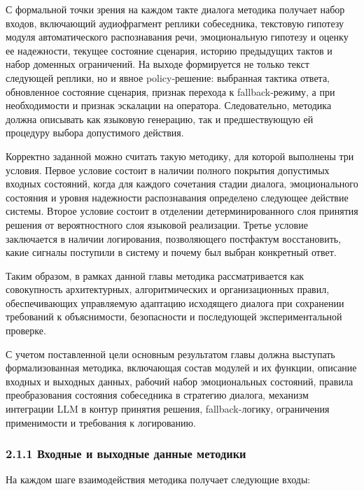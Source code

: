 \documentclass[a4paper,14pt]{extarticle}
\renewcommand{\texttt}[1]{\textnormal{#1}}
\begin{document}
С формальной точки зрения на каждом такте диалога методика получает
набор входов, включающий аудиофрагмент реплики собеседника, текстовую
гипотезу модуля автоматического распознавания речи, эмоциональную
гипотезу и оценку ее надежности, текущее состояние сценария, историю
предыдущих тактов и набор доменных ограничений. На выходе формируется не
только текст следующей реплики, но и явное policy-решение: выбранная
тактика ответа, обновленное состояние сценария, признак перехода к
fallback-режиму, а при необходимости и признак эскалации на оператора.
Следовательно, методика должна описывать как языковую генерацию, так и
предшествующую ей процедуру выбора допустимого действия.

Корректно заданной можно считать такую методику, для которой выполнены
три условия. Первое условие состоит в наличии полного покрытия
допустимых входных состояний, когда для каждого сочетания стадии
диалога, эмоционального состояния и уровня надежности распознавания
определено следующее действие системы. Второе условие состоит в
отделении детерминированного слоя принятия решения от вероятностного
слоя языковой реализации. Третье условие заключается в наличии
логирования, позволяющего постфактум восстановить, какие сигналы
поступили в систему и почему был выбран конкретный ответ.

Таким образом, в рамках данной главы методика рассматривается как
совокупность архитектурных, алгоритмических и организационных правил,
обеспечивающих управляемую адаптацию исходящего диалога при сохранении
требований к объяснимости, безопасности и последующей экспериментальной
проверке.

С учетом поставленной цели основным результатом главы должна выступать
формализованная методика, включающая состав модулей и их функции,
описание входных и выходных данных, рабочий набор эмоциональных
состояний, правила преобразования состояния собеседника в стратегию
диалога, механизм интеграции \texttt{LLM} в контур принятия решения,
fallback-логику, ограничения применимости и требования к логированию.

\subsubsection{2.1.1 Входные и выходные данные
методики}\label{ux432ux445ux43eux434ux43dux44bux435-ux438-ux432ux44bux445ux43eux434ux43dux44bux435-ux434ux430ux43dux43dux44bux435-ux43cux435ux442ux43eux434ux438ux43aux438}

На каждом шаге взаимодействия методика получает следующие входы:
\end{document}
